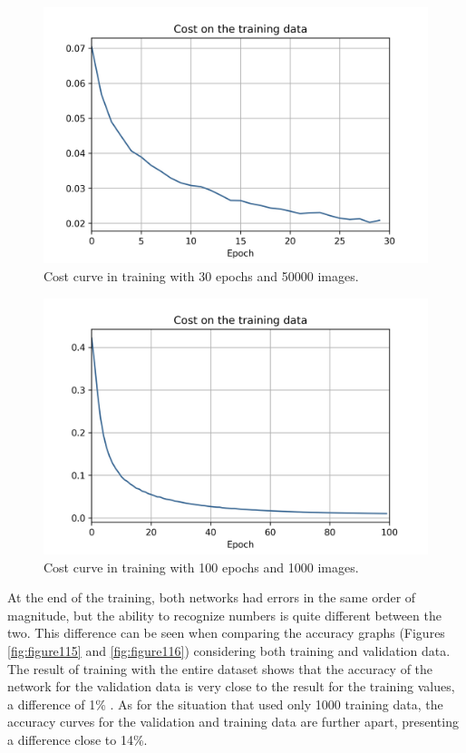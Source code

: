 \begin{figure}
    \centering
    \includegraphics[scale=0.6]{images/figure113.jpg}
    \caption{Cost curve in training with 30 epochs and 50000 images.}
    \label{fig:figure113}
\end{figure}

\begin{figure}
    \centering
    \includegraphics[scale=0.6]{images/figure114.jpg}
    \caption{Cost curve in training with 100 epochs and 1000 images.}
    \label{fig:figure114}
\end{figure}

At the end of the training, both networks had errors in the same order of magnitude, but the ability to recognize numbers is quite different between the two. This difference can be seen when comparing the accuracy graphs (Figures \ref{fig:figure115} and \ref{fig:figure116}) considering both training and validation data. The result of training with the entire dataset shows that the accuracy of the network for the validation data is very close to the result for the training values, a difference of 1\% . As for the situation that used only 1000 training data, the accuracy curves for the validation and training data are further apart, presenting a difference close to 14\%.

